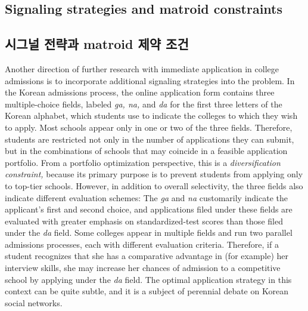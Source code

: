 \documentclass[11pt]{article} %
\theoremstyle{definition}
\theoremstyle{definition}
\begin{document}
\ifen \subsection{Signaling strategies and matroid constraints}\else \subsection{시그널 전략과 matroid 제약 조건}\fi
\ifen
Another direction of further research with immediate application in college admissions is to incorporate additional signaling strategies into the problem. In the Korean admissions process, the online application form contains three multiple-choice fields, labeled \emph{ga, na,} and \emph{da} for the first three letters of the Korean alphabet, which students use to indicate the colleges to which they wish to apply. Most schools appear only in one or two of the three fields. Therefore, students are restricted not only in the number of applications they can submit, but in the combinations of schools that may coincide in a feasible application portfolio. From a portfolio optimization perspective, this is a \emph{diversification constraint,} because its primary purpose is to prevent students from applying only to top-tier schools. However, in addition to overall selectivity, the three fields also indicate different evaluation schemes: The \emph{ga} and \emph{na} customarily indicate the applicant's first and second choice, and applications filed under these fields are evaluated with greater emphasis on standardized-test scores than those filed under the \emph{da} field. Some colleges appear in multiple fields and run two parallel admissions processes, each with different evaluation criteria. Therefore, if a student recognizes that she has a comparative advantage in (for example) her interview skills, she may increase her chances of admission to a competitive school by applying under the \emph{da} field. The optimal application strategy in this context can be quite subtle, and it is a subject of perennial debate on Korean social networks.
\end{document}
